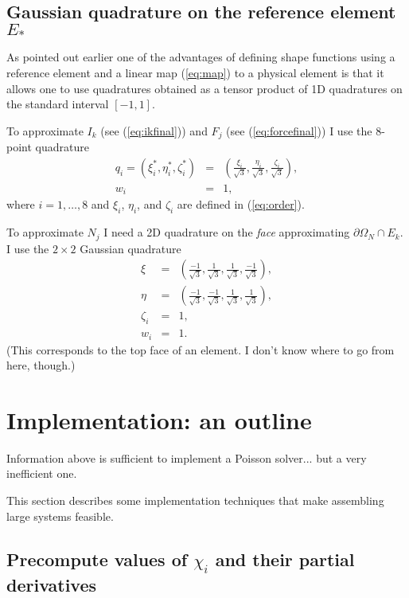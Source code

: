 \documentclass{article}
\begin{document}
\subsection{Gaussian quadrature on the reference element $E_{\ast}$}

As pointed out earlier one of the advantages of defining shape functions using
a reference element and a linear map (\ref{eq:map}) to a physical element is
that it allows one to use quadratures obtained as a tensor product of 1D
quadratures on the standard interval $[ - 1, 1]$.

To approximate $I_k$ (see (\ref{eq:ikfinal})) and $F_j$ (see
(\ref{eq:forcefinal})) I use the $8$-point quadrature
\begin{eqnarray*}
  q_i = (\xi^{\ast}_i, \eta^{\ast}_i, \zeta^{\ast}_i) & = & \left(
  \frac{\xi_i}{\sqrt{3}}, \frac{\eta_i}{\sqrt{3}}, \frac{\zeta_i}{\sqrt{3}}
  \right),\\
  w_i & = & 1,
\end{eqnarray*}
where $i = 1, \ldots, 8$ and $\xi_i$, $\eta_i$, and $\zeta_i$ are defined in
(\ref{eq:order}).

To approximate $N_j$ I need a 2D quadrature on the \emph{face}
approximating $\partial \Omega_N \cap E_k$. I use the $2 \times 2$ Gaussian
quadrature
\begin{eqnarray*}
  \xi & = & \left(\frac{- 1}{\sqrt{3}}, \frac{1}{\sqrt{3}},
  \frac{1}{\sqrt{3}}, \frac{- 1}{\sqrt{3}} \right),\\
  \eta & = & \left(\frac{- 1}{\sqrt{3}}, \frac{- 1}{\sqrt{3}},
  \frac{1}{\sqrt{3}}, \frac{1}{\sqrt{3}} \right),\\
  \zeta_i & = & 1,\\
  w_i & = & 1.
\end{eqnarray*}
(This corresponds to the top face of an element. I don't know where to go from
here, though.)

\section{Implementation: an outline}

Information above is sufficient to implement a Poisson solver... but a very
inefficient one.

This section describes some implementation techniques that make assembling
large systems feasible.

\subsection{Precompute values of $\chi_i$ and their partial derivatives}
\end{document}
